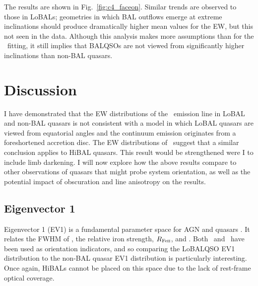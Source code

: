 The results are shown in Fig.~\ref{fig:c4_faceon}. 
Similar trends are observed to those in LoBALs; geometries
in which BAL outflows emerge at extreme inclinations should produce
dramatically higher mean values for the EW, but this not seen in 
the data. Although this analysis makes more assumptions than for the \ewo\
fitting, it still implies that BALQSOs are not viewed from significantly 
higher inclinations than non-BAL quasars.


\section{Discussion}
\label{sec:discuss_ew}
I have demonstrated that the EW distributions of the 
\oiiifull\ emission line in LoBAL and non-BAL
quasars is not consistent with a 
model in which LoBAL quasars are viewed from equatorial angles 
and the continuum emission originates from
a foreshortened accretion disc. The EW distributions of 
\civline\ suggest that a similar conclusion applies to HiBAL quasars.
This result would be strengthened were 
I to include limb darkening. I will now explore how the above results compare to other
observations of quasars that might probe system orientation, as 
well as the potential impact of obscuration and line anisotropy
on the results.

\subsection{Eigenvector 1}


Eigenvector 1 (EV1) is a fundamental parameter space for AGN and quasars
\citep{borosongreen,sulentic2000ev1,marziani2001,shenho2014}. 
It relates the FWHM of \hb, the relative iron strength, 
$R_{{\rm Fe \textsc{ii}}}$, and
\ewo. Both \ewo\ and \fwh\ have been used as orientation
indicators, and so comparing the LoBALQSO EV1 distribution to the non-BAL 
quasar EV1 distribution is particularly interesting. Once again,
HiBALs cannot be placed on this space due to the lack of rest-frame 
optical coverage.

